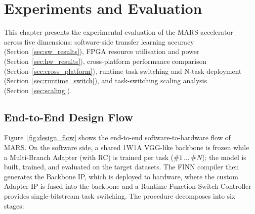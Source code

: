 \documentclass[12pt, a4paper]{report}
\numberwithin{equation}{chapter}
\numberwithin{figure}{chapter}
\numberwithin{table}{chapter}
\numberwithin{algorithm}{chapter}
\begin{document}
\chapter{Experiments and Evaluation}
\label{ch:experiments}

This chapter presents the experimental evaluation of the MARS accelerator across five dimensions: software-side transfer learning accuracy (Section~\ref{sec:sw_results}), FPGA resource utilisation and power (Section~\ref{sec:hw_results}), cross-platform performance comparison (Section~\ref{sec:cross_platform}), runtime task switching and N-task deployment (Section~\ref{sec:runtime_switch}), and task-switching scaling analysis (Section~\ref{sec:scaling}).

\section{End-to-End Design Flow}
\label{sec:design_flow}

Figure~\ref{fig:design_flow} shows the end-to-end software-to-hardware flow of MARS. On the software side, a shared 1W1A VGG-like backbone is frozen while a Multi-Branch Adapter (with RC) is trained per task ($\#1\,\ldots\,\#N$); the model is built, trained, and evaluated on the target datasets. The FINN compiler then generates the Backbone IP, which is deployed to hardware, where the custom Adapter IP is fused into the backbone and a Runtime Function Switch Controller provides single-bitstream task switching. The procedure decomposes into six stages:
\end{document}
